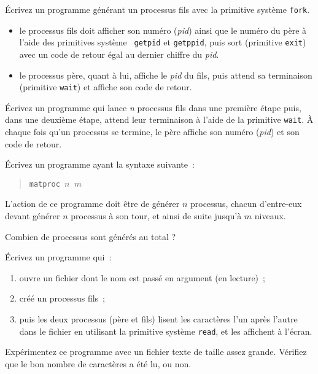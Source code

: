 %


% 


\question

Écrivez un programme générant un processus fils avec la primitive
système {\tt fork}.

\begin {itemize}
    \item le processus fils doit afficher son numéro ({\em pid}) ainsi
	que le numéro du père à l'aide des primitives système {\tt
	getpid} et {\tt getppid}, puis sort (primitive {\tt exit}) avec
	un code de retour égal au dernier chiffre du {\em pid}.

    \item le processus père, quant à lui, affiche le {\em pid} du fils,
	puis attend sa terminaison (primitive {\tt wait}) et affiche son
	code de retour.

\end {itemize}


\question

Écrivez un programme qui lance {\em n} processus fils dans une
première étape puis, dans une deuxième étape, attend leur terminaison
à l'aide de la primitive {\tt wait}.
\`A chaque fois qu'un processus se termine,
le père affiche son numéro ({\em pid}) et son code de retour.


\question

Écrivez un programme ayant la syntaxe suivante~:

\vspace* {-3mm}
\begin {quote}
{\tt matproc $n$ $m$}
\end {quote}

L'action de ce programme doit être de générer $n$ processus, chacun
d'entre-eux devant générer $n$ processus à son tour, et ainsi de suite
jusqu'à $m$ niveaux.

Combien de processus sont générés au total ?

\question

Écrivez un programme qui~:
\begin {enumerate}
    \item ouvre un fichier dont le nom est passé en argument (en
	lecture)~;
    \item créé un processus fils~;
    \item puis les deux processus (père et fils) lisent les caractères
	l'un après l'autre dans le fichier en utilisant la primitive système
	{\tt read}, et les affichent à l'écran.
\end {enumerate}
Expérimentez ce programme avec un fichier texte de taille assez grande.
Vérifiez que le bon nombre de caractères a été lu, ou non.

